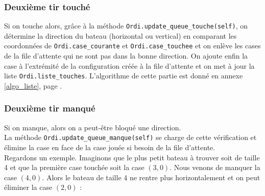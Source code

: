 \subsubsection{Deuxième tir touché}
Si on touche alors, grâce à la méthode \texttt{Ordi.update\_queue\_touche(self)}, on détermine la direction du bateau (horizontal ou vertical) en comparant les coordonnées de \texttt{Ordi.case\_courante} et \texttt{Ordi.case\_touchee} et on enlève les cases de la file d'attente qui ne sont pas dans la bonne direction. On ajoute enfin la case à l'extrémité de la configuration créée à la file d'attente et on met à jour la liste \texttt{Ordi.liste\_touches}. L'algorithme de cette partie est donné en annexe \ref{algo_liste}, page \pageref{update_queue_touche}.
\subsubsection{Deuxième tir manqué}
Si on manque, alors on a peut-être bloqué une direction.\\
La méthode \texttt{Ordi.update\_queue\_manque(self)} se charge de cette vérification et élimine la case en face de la case jouée si besoin de la file d'attente.\\
Regardons un exemple. Imaginons que le plus petit bateau à trouver soit de taille 4 et que la première case touchée soit la case $(3,0)$. Nous venons de manquer la case $(4,0)$. Alors le bateau de taille 4 ne rentre plus horizontalement et on peut éliminer la case $(2,0)$ :

